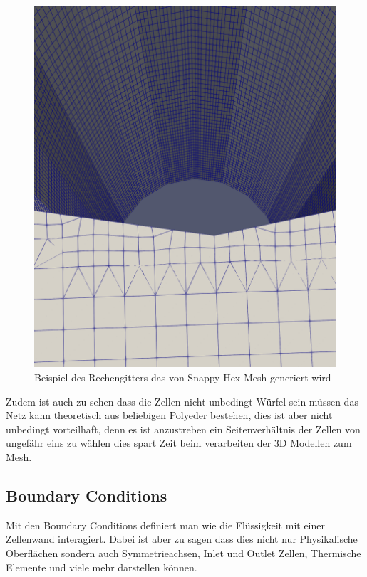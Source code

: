 \begin{figure}[h]
	\centering
	\includegraphics[scale=0.1]{papers/openfoam/Bilder/grid.png }
	\caption{Beispiel des Rechengitters das von Snappy Hex Mesh generiert wird}
	\label{openfoam:fig:sim_grid}
\end{figure}
Zudem ist auch zu sehen dass die Zellen nicht unbedingt Würfel sein müssen das Netz kann theoretisch aus beliebigen Polyeder bestehen,  dies ist aber nicht unbedingt vorteilhaft, denn es ist anzustreben ein Seitenverhältnis der Zellen von ungefähr eins zu wählen dies spart Zeit beim verarbeiten der 3D Modellen zum Mesh.

\subsection{Boundary Conditions}
Mit den Boundary Conditions definiert man wie die Flüssigkeit mit einer Zellenwand interagiert.
Dabei ist aber zu sagen dass dies nicht nur Physikalische Oberflächen sondern auch Symmetrieachsen, Inlet und Outlet Zellen, Thermische Elemente und viele mehr darstellen können.

